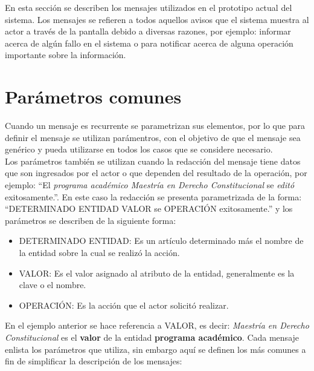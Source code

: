 
	En esta sección se describen los mensajes utilizados en el prototipo actual del sistema. Los mensajes se refieren a todos aquellos avisos que el sistema muestra al actor a través de la pantalla debido a diversas razones, por ejemplo: informar acerca de algún fallo en el sistema o para notificar acerca de alguna operación importante sobre la información.

\section{Parámetros comunes}
	Cuando un mensaje es recurrente se parametrizan sus elementos, %
	por lo que para definir el mensaje se utilizan parámentros, con el objetivo de que el mensaje sea genérico y pueda utilizarse en todos los casos que se considere necesario.\\
    
	Los parámetros también se utilizan cuando la redacción del mensaje tiene datos que son ingresados por el actor o que dependen del resultado de la operación, por ejemplo: ``El {\em programa académico  Maestría en Derecho Constitucional} se {\em editó} exitosamente.''. En este caso la redacción se presenta parametrizada de la forma: ``DETERMINADO ENTIDAD VALOR se OPERACIÓN exitosamente.'' y los parámetros se describen de la siguiente forma:
    
    \begin{itemize}
		\item DETERMINADO ENTIDAD: Es un artículo determinado más el nombre de la entidad sobre la cual se realizó la acción.
		\item VALOR: Es el valor asignado al atributo de la entidad, generalmente es la clave o el nombre.
		\item OPERACIÓN: Es la acción que el actor solicitó realizar.
    \end{itemize}

    En el ejemplo anterior se hace referencia a VALOR, es decir: {\em Maestría en Derecho Constitucional} es el {\bf valor}  de la entidad {\bf programa académico}. Cada mensaje enlista los parámetros que utiliza, sin embargo aquí se definen los más comunes a fin de simplificar la descripción de los mensajes:

